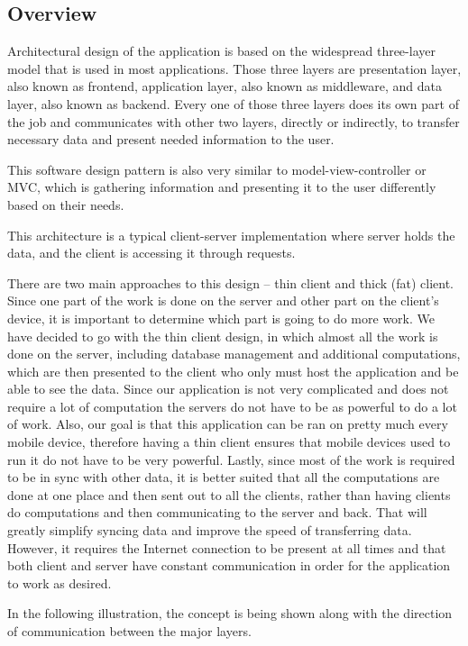 
\subsection{Overview}
\label{sec:overview}
\hspace{\parindent}Architectural design of the application is based on the widespread three-layer model that is used in most applications. Those three layers are presentation layer, also known as frontend, application layer, also known as middleware, and data layer, also known as backend. Every one of those three layers does its own part of the job and communicates with other two layers, directly or indirectly, to transfer necessary data and present needed information to the user. 

This software design pattern is also very similar to model-view-controller or MVC, which is gathering information and presenting it to the user differently based on their needs. 

This architecture is a typical client-server implementation where server holds the data, and the client is accessing it through requests. 

There are two main approaches to this design – thin client and thick (fat) client. Since one part of the work is done on the server and other part on the client’s device, it is important to determine which part is going to do more work. We have decided to go with the thin client design, in which almost all the work is done on the server, including database management and additional computations, which are then presented to the client who only must host the application and be able to see the data. Since our application is not very complicated and does not require a lot of computation the servers do not have to be as powerful to do a lot of work. Also, our goal is that this application can be ran on pretty much every mobile device, therefore having a thin client ensures that mobile devices used to run it do not have to be very powerful. Lastly, since most of the work is required to be in sync with other data, it is better suited that all the computations are done at one place and then sent out to all the clients, rather than having clients do computations and then communicating to the server and back. That will greatly simplify syncing data and improve the speed of transferring data. However, it requires the Internet connection to be present at all times and that both client and server have constant communication in order for the application to work as desired.  

In the following illustration, the concept is being shown along with the direction of communication between the major layers.\newline 

